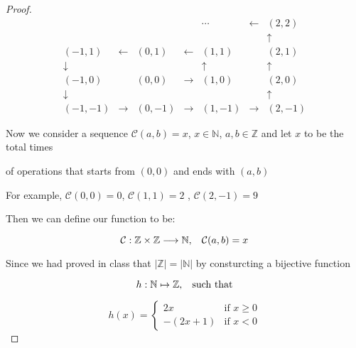\documentclass[12pt]{article}
\begin{document}
\begin{proof}
    \[ \begin{matrix}
        & & & &\cdots &\longleftarrow & (2,2) \\
        & & & & & & \uparrow \\
        (-1,1) &\longleftarrow &(0,1) &\longleftarrow & (1,1)& &(2,1) \\
        \downarrow& & & &\uparrow& &\uparrow \\
        (-1,0) & & (0,0) &\longrightarrow & (1,0) & & (2,0)\\
        \downarrow& & & & & &\uparrow\\
        (-1,-1) &\longrightarrow &(0,-1) & \longrightarrow&(1,-1) & \longrightarrow&(2,-1)
    \end{matrix} \]

    \vspace*{0.3cm}
    \hspace*{1cm}
    Now we consider a sequence $\mathcal{C}(a,b) = x$, $x \in \mathbb{N}$,
     $a,b \in \mathbb{Z}$ and let $x$ to be the total times 
     
    \vspace*{0.3cm}
    \hspace*{1cm}
    of operations that starts from
     $(0,0)$ and ends with $(a,b)$

    \vspace*{0.3cm}
    \hspace*{1cm}
    For example, $\mathcal{C}(0,0) = 0$, $\mathcal{C}(1,1) = 2$
    , $\mathcal{C}(2,-1) = 9$

    
    \vspace*{0.3cm}
    \hspace*{1cm}
    Then we can define our function to be:

    \[ \mathcal{C}: \mathbb{Z}\times \mathbb{Z} \longrightarrow
    \mathbb{N}, \hspace*{0.3cm} \mathcal{C}(a,b) = x \]

    \vspace*{0.3cm}
    \hspace*{1cm}
    Since we had proved in class that $\vert \mathbb{Z} \vert 
    = \vert \mathbb{N} \vert $ by consturcting a bijective function

    \[ h: \mathbb{N} \mapsto \mathbb{Z}, \hspace*{0.3cm} \text{such that} \]
    
    
    \begin{equation*}
        h(x)=
            \begin{cases}
                2x & \text{if } x \geq 0\\
                -(2x+1) & \text{if } x < 0
            \end{cases}
        \end{equation*}
    

\end{proof}
\end{document}
